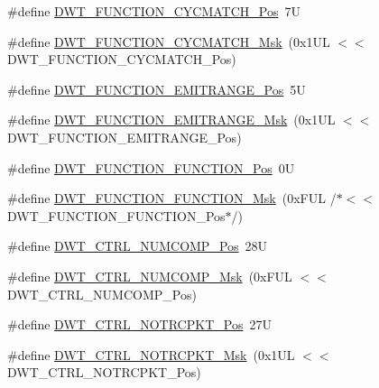 \begin{DoxyCompactItemize}
\item 
\#define \mbox{\hyperlink{group___c_m_s_i_s___d_w_t_ga4b65d79ca37ae8010b4a726312413efd}{D\+W\+T\+\_\+\+F\+U\+N\+C\+T\+I\+O\+N\+\_\+\+C\+Y\+C\+M\+A\+T\+C\+H\+\_\+\+Pos}}~7U
\item 
\#define \mbox{\hyperlink{group___c_m_s_i_s___d_w_t_ga8e2ed09bdd33a8f7f7ce0444f5f3bb25}{D\+W\+T\+\_\+\+F\+U\+N\+C\+T\+I\+O\+N\+\_\+\+C\+Y\+C\+M\+A\+T\+C\+H\+\_\+\+Msk}}~(0x1\+U\+L $<$$<$ D\+W\+T\+\_\+\+F\+U\+N\+C\+T\+I\+O\+N\+\_\+\+C\+Y\+C\+M\+A\+T\+C\+H\+\_\+\+Pos)
\item 
\#define \mbox{\hyperlink{group___c_m_s_i_s___d_w_t_ga41d5b332216baa8d29561260a1b85659}{D\+W\+T\+\_\+\+F\+U\+N\+C\+T\+I\+O\+N\+\_\+\+E\+M\+I\+T\+R\+A\+N\+G\+E\+\_\+\+Pos}}~5U
\item 
\#define \mbox{\hyperlink{group___c_m_s_i_s___d_w_t_gad46dd5aba29f2e28d4d3f50b1d291f41}{D\+W\+T\+\_\+\+F\+U\+N\+C\+T\+I\+O\+N\+\_\+\+E\+M\+I\+T\+R\+A\+N\+G\+E\+\_\+\+Msk}}~(0x1\+U\+L $<$$<$ D\+W\+T\+\_\+\+F\+U\+N\+C\+T\+I\+O\+N\+\_\+\+E\+M\+I\+T\+R\+A\+N\+G\+E\+\_\+\+Pos)
\item 
\#define \mbox{\hyperlink{group___c_m_s_i_s___d_w_t_ga5797b556edde2bbaa4d33dcdb1a891bb}{D\+W\+T\+\_\+\+F\+U\+N\+C\+T\+I\+O\+N\+\_\+\+F\+U\+N\+C\+T\+I\+O\+N\+\_\+\+Pos}}~0U
\item 
\#define \mbox{\hyperlink{group___c_m_s_i_s___d_w_t_ga3b2cda708755ecf5f921d08b25d774d1}{D\+W\+T\+\_\+\+F\+U\+N\+C\+T\+I\+O\+N\+\_\+\+F\+U\+N\+C\+T\+I\+O\+N\+\_\+\+Msk}}~(0x\+F\+U\+L /$\ast$$<$$<$ D\+W\+T\+\_\+\+F\+U\+N\+C\+T\+I\+O\+N\+\_\+\+F\+U\+N\+C\+T\+I\+O\+N\+\_\+\+Pos$\ast$/)
\item 
\#define \mbox{\hyperlink{group___c_m_s_i_s___d_w_t_gaac44b9b7d5391a7ffef129b7f6c84cd7}{D\+W\+T\+\_\+\+C\+T\+R\+L\+\_\+\+N\+U\+M\+C\+O\+M\+P\+\_\+\+Pos}}~28U
\item 
\#define \mbox{\hyperlink{group___c_m_s_i_s___d_w_t_gaa3d37d68c2ba73f2026265584c2815e7}{D\+W\+T\+\_\+\+C\+T\+R\+L\+\_\+\+N\+U\+M\+C\+O\+M\+P\+\_\+\+Msk}}~(0x\+F\+U\+L $<$$<$ D\+W\+T\+\_\+\+C\+T\+R\+L\+\_\+\+N\+U\+M\+C\+O\+M\+P\+\_\+\+Pos)
\item 
\#define \mbox{\hyperlink{group___c_m_s_i_s___d_w_t_gaa82840323a2628e7f4a2b09b74fa73fd}{D\+W\+T\+\_\+\+C\+T\+R\+L\+\_\+\+N\+O\+T\+R\+C\+P\+K\+T\+\_\+\+Pos}}~27U
\item 
\#define \mbox{\hyperlink{group___c_m_s_i_s___d_w_t_ga04d8bb0a065ca38e2e5f13a97e1f7073}{D\+W\+T\+\_\+\+C\+T\+R\+L\+\_\+\+N\+O\+T\+R\+C\+P\+K\+T\+\_\+\+Msk}}~(0x1\+U\+L $<$$<$ D\+W\+T\+\_\+\+C\+T\+R\+L\+\_\+\+N\+O\+T\+R\+C\+P\+K\+T\+\_\+\+Pos)

\end{DoxyCompactItemize}
